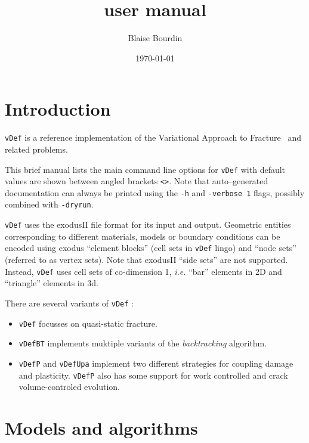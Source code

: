 \documentclass[10pt,oneside]{memoir}
\title{\vDef user manual}
\author{Blaise Bourdin}
\date{\today}
\def\vDef{{\texttt{vDef}} }
\def\vDefBT{{\texttt{vDefBT}} }
\def\vDefP{{\texttt{vDefP}} }
\def\vDefUPA{{\texttt{vDefUpa}} }
\begin{document}

\maketitle

\tableofcontents
\chapter*{Introduction}
\vDef is a reference implementation of the Variational Approach to Fracture~\cite{Francfort-Marigo-1998,Bourdin-Francfort-EtAl-2008b} and related problems. 
 
 

This brief manual lists the main command line options for \vDef with default values are shown between angled brackets \verb+<>+. Note that auto--generated documentation can always be printed using the \texttt{-h} and  \texttt{-verbose 1} flags, possibly combined with \texttt{-dryrun}.


\vDef uses the exodusII file format for its input and output. Geometric entities corresponding to different materials, models or boundary conditions can be encoded using exodus ``element blocks'' (cell sets in \vDef lingo) and ``node sets'' (referred to as vertex sets). Note that exodusII ``side sets'' are not supported. Instead, \vDef uses cell sets of co-dimension 1, \emph{i.e.} ``bar'' elements in 2D and ``triangle'' elements in 3d.

There are several variants of \vDef:
\begin{itemize}
    \item \vDef focusses on quasi-static fracture.
    \item \vDefBT implements muktiple variants of the \emph{backtracking} algorithm.
    \item \vDefP and \vDefUPA implement two different strategies for coupling damage and plasticity. \vDefP also has some support for work controlled and crack volume-controled evolution.
\end{itemize}
\newpage
\chapter{Models and algorithms}
\end{document}
